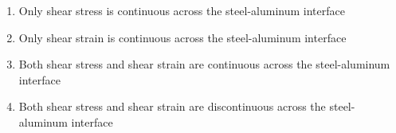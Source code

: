 \documentclass[journal]{IEEEtran}
\begin{document}
\begin{enumerate}[start=27]
\begin{figure}[H]
    \label{fig:enter-label}
\end{figure}
\begin{enumerate}
    \item Only shear stress is continuous across the steel-aluminum interface
    \item Only shear strain is continuous across the steel-aluminum interface
    \item Both shear stress and shear strain are continuous across the steel-aluminum interface
    \item Both shear stress and shear strain are discontinuous across the steel-aluminum interface
\end{enumerate}
\end{enumerate}
\end{document}

